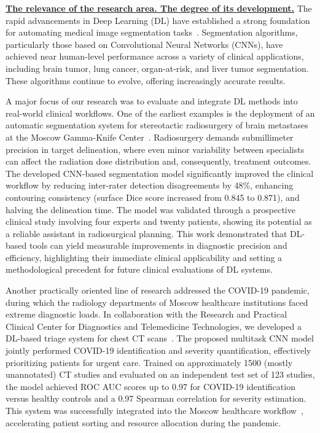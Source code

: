 

\underline{\textbf{The relevance of the research area. The degree of its development.}}
The rapid advancements in Deep Learning (DL) have established a strong foundation for automating medical image segmentation tasks~\cite{lee2017deep}. Segmentation algorithms, particularly those based on Convolutional Neural Networks (CNNs), have achieved near human-level performance across a variety of clinical applications, including brain tumor, lung cancer, organ-at-risk, and liver tumor segmentation. These algorithms continue to evolve, offering increasingly accurate results.

A major focus of our research was to evaluate and integrate DL methods into real-world clinical workflows. One of the earliest examples is the deployment of an automatic segmentation system for stereotactic radiosurgery of brain metastases at the Moscow Gamma-Knife Center~\cite{shirokikh2022systematic}. Radiosurgery demands submillimeter precision in target delineation, where even minor variability between specialists can affect the radiation dose distribution and, consequently, treatment outcomes. The developed CNN-based segmentation model significantly improved the clinical workflow by reducing inter-rater detection disagreements by 48\%, enhancing contouring consistency (surface Dice score increased from 0.845 to 0.871), and halving the delineation time. The model was validated through a prospective clinical study involving four experts and twenty patients, showing its potential as a reliable assistant in radiosurgical planning. This work demonstrated that DL-based tools can yield measurable improvements in diagnostic precision and efficiency, highlighting their immediate clinical applicability and setting a methodological precedent for future clinical evaluations of DL systems.

Another practically oriented line of research addressed the COVID-19 pandemic, during which the radiology departments of Moscow healthcare institutions faced extreme diagnostic loads. In collaboration with the Research and Practical Clinical Center for Diagnostics and Telemedicine Technologies, we developed a DL-based triage system for chest CT scans~\cite{goncharov2021ct}. The proposed multitask CNN model jointly performed COVID-19 identification and severity quantification, effectively prioritizing patients for urgent care. Trained on approximately 1500 (mostly unannotated) CT studies and evaluated on an independent test set of 123 studies, the model achieved ROC AUC scores up to 0.97 for COVID-19 identification versus healthy controls and a 0.97 Spearman correlation for severity estimation. This system was successfully integrated into the Moscow healthcare workflow~\cite{covid-program}, accelerating patient sorting and resource allocation during the pandemic.%

